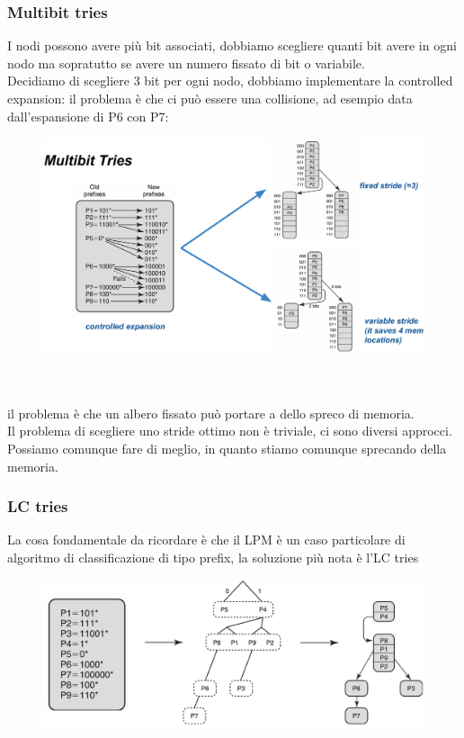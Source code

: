 \documentclass[12pt, oneside]{extbook} %
\begin{document}
\subsubsection{Multibit tries}
I nodi possono avere più bit associati, dobbiamo scegliere quanti bit avere in ogni nodo ma sopratutto se avere un numero fissato di bit o variabile.
\\Decidiamo di scegliere 3 bit per ogni nodo, dobbiamo implementare la controlled expansion: il problema è che ci può essere una collisione, ad esempio data dall'espansione di P6 con P7:\\
\begin{figure}[h!]
    \centering
    \includegraphics[scale=0.5]{../../immagini/multibit_tries}
\end{figure}\\\\
il problema è che un albero fissato può portare a dello spreco di memoria.\\
Il problema di scegliere uno stride ottimo non è triviale, ci sono diversi approcci.
\\Possiamo comunque fare di meglio, in quanto stiamo comunque sprecando della memoria.

\subsubsection{LC tries}
La cosa fondamentale da ricordare è che il LPM è un caso particolare di algoritmo di classificazione di tipo prefix, la soluzione più nota è l'LC tries\\
\begin{figure}
    \centering
    \includegraphics[scale=0.5]{../../immagini/lc_trie}
\end{figure}
\end{document}
